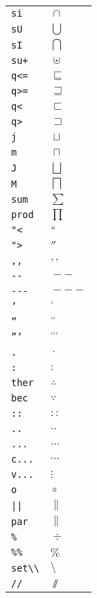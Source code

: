 \begin{longtable}{ll}
\texttt{si}&${}\cap {}$\\
\texttt{sU}&${}\bigcup {}$\\
\texttt{sI}&${}\bigcap {}$\\
\texttt{su+}&${}\uplus {}$\\
\texttt{q<=}&${}\sqsubseteq {}$\\
\texttt{q>=}&${}\sqsupseteq {}$\\
\texttt{q<}&${}\sqsubset {}$\\
\texttt{q>}&${}\sqsupset {}$\\
\texttt{j}&${}\sqcup {}$\\
\texttt{m}&${}\sqcap {}$\\
\texttt{J}&${}\bigsqcup {}$\\
\texttt{M}&${}\bigsqcap {}$\\
\texttt{sum}&${}\sum {}$\\
\texttt{prod}&${}\prod {}$\\
\texttt{"<}&${}``{}$\\
\texttt{">}&${}''{}$\\
\texttt{,,}&${},\!\!, {}$\\
\texttt{{-}{-}}&${}--{}$\\
\texttt{{-}{-}{-}}&${}---{}$\\
\texttt{'}&${}^{\prime} {}$\\
\texttt{''}&${}^{\prime\prime} {}$\\
\texttt{'''}&${}^{\prime\prime\prime} {}$\\
\texttt{.}&${}\cdotp {}$\\
\texttt{:}&${}: {}$\\
\texttt{ther}&${}\therefore {}$\\
\texttt{bec}&${}\because {}$\\
\texttt{::}&${}:: {}$\\
\texttt{..}&${}.. {}$\\
\texttt{...}&${}\ldots {}$\\
\texttt{c...}&${}\cdots {}$\\
\texttt{v...}&${}\vdots {}$\\
\texttt{o}&${}\circ {}$\\
\texttt{||}&${}\| {}$\\
\texttt{par}&${}\parallel {}$\\
\texttt{\%}&${}\div {}$\\
\texttt{\%\%}&${}\% {}$\\
\texttt{set\textbackslash \textbackslash }&${}\setminus {}$\\
\texttt{//}&${}\sslash {}$\\

\end{longtable}
